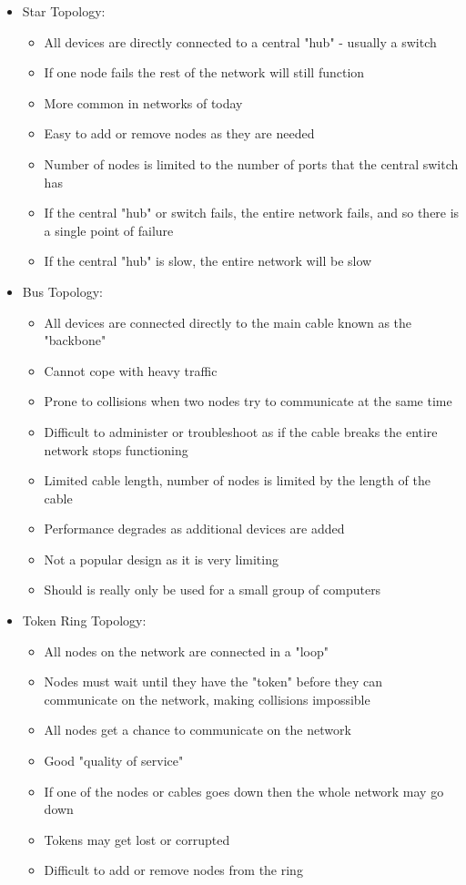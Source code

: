\begin{itemize}
  \item Star Topology:
  \begin{itemize}
    \item All devices are directly connected to a central "hub" - usually a switch
    \item If one node fails the rest of the network will still function
    \item More common in networks of today
    \item Easy to add or remove nodes as they are needed
    \item Number of nodes is limited to the number of ports that the central switch has
    \item If the central "hub" or switch fails, the entire network fails, and so there is a single point of failure
    \item If the central "hub" is slow, the entire network will be slow
  \end{itemize}

  \item Bus Topology:
  \begin{itemize}
    \item All devices are connected directly to the main cable known as the "backbone"
    \item Cannot cope with heavy traffic
    \item Prone to collisions when two nodes try to communicate at the same time
    \item Difficult to administer or troubleshoot as if the cable breaks the entire network stops functioning
    \item Limited cable length, number of nodes is limited by the length of the cable
    \item Performance degrades as additional devices are added
    \item Not a popular design as it is very limiting
    \item Should is really only be used for a small group of computers
  \end{itemize}
  
  \item Token Ring Topology:
  \begin{itemize}
    \item All nodes on the network are connected in a "loop"
    \item Nodes must wait until they have the "token" before they can communicate on the network, making collisions impossible
    \item All nodes get a chance to communicate on the network
    \item Good "quality of service"
    \item If one of the nodes or cables goes down then the whole network may go down
    \item Tokens may get lost or corrupted
    \item Difficult to add or remove nodes from the ring
  \end{itemize}
  

\end{itemize}
